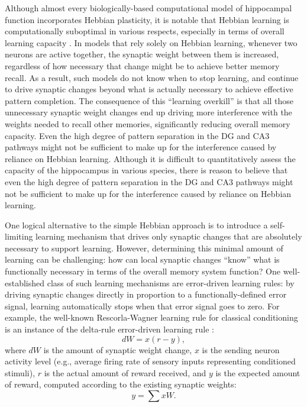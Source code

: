 \documentclass[11pt,twoside]{article}
\newif\myifpdf
\begin{document}
Although almost every biologically-based computational model of hippocampal function incorporates Hebbian plasticity, it is notable that Hebbian learning is computationally suboptimal in various respects, especially in terms of overall learning capacity \citep{Abu-MostafaSt.Jacques85,TrevesRolls91}.  In models that rely solely on Hebbian learning, whenever two neurons are active together, the synaptic weight between them is increased, regardless of how necessary that change might be to achieve better memory recall.  As a result, such models do not know when to stop learning, and continue to drive synaptic changes beyond what is actually necessary to achieve effective pattern completion.  The consequence of this ``learning overkill'' is that all those unnecessary synaptic weight changes end up driving more interference with the weights needed to recall other memories, significantly reducing overall memory capacity. Even the high degree of pattern separation in the DG and CA3 pathways might not be sufficient to make up for the interference caused by reliance on Hebbian learning. Although it is difficult to quantitatively assess the capacity of the hippocampus in various species, there is reason to believe that even the high degree of pattern separation in the DG and CA3 pathways might not be sufficient to make up for the interference caused by reliance on Hebbian learning.

One logical alternative to the simple Hebbian approach is to introduce a self-limiting learning mechanism that drives only synaptic changes that are absolutely necessary to support learning.  However, determining this minimal amount of learning can be challenging: how can local synaptic changes ``know'' what is functionally necessary in terms of the overall memory system function?  One well-established class of such learning mechanisms are error-driven learning rules: by driving synaptic changes directly in proportion to a functionally-defined error signal, learning automatically stops when that error signal goes to zero. For example, the well-known Rescorla-Wagner learning rule for classical conditioning \citep{RescorlaWagner72} is an instance of the delta-rule error-driven learning rule \citep{WidrowHoff60}:
\begin{equation}
	dW = x (r - y),
\end{equation}
where $dW$ is the amount of synaptic weight change, $x$ is the sending neuron activity level (e.g., average firing rate of sensory inputs representing conditioned stimuli), $r$ is the actual amount of reward received, and $y$ is the expected amount of reward, computed according to the existing synaptic weights:
\begin{equation}
	y = \sum x W.
\end{equation}
\end{document}
